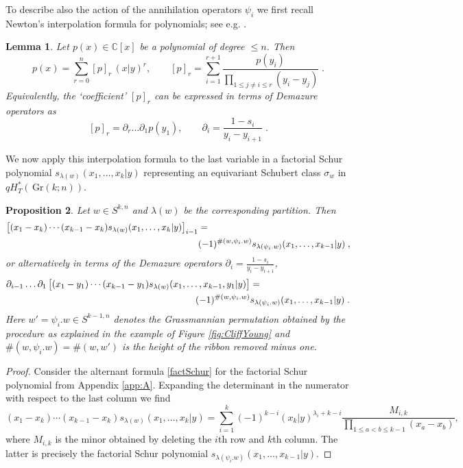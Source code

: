 \documentclass[12pt]{amsart}
\newcommand{\C}{\mathbb{C}}
\newcommand{\Gr}{\,\mathrm{Gr}}
\newtheorem{prop}{Proposition}[section]
\newtheorem{lemma}[prop]{Lemma}
\numberwithin{equation}{section}
\numberwithin{figure}{section}
\begin{document}
To describe also the action of the annihilation operators $\psi_i$ we first recall Newton's interpolation formula for polynomials; see e.g. \cite{macdonald1991notes}.
\begin{lemma}
    Let $p(x)\in\C[x]$ be a polynomial of degree $\le n$. Then
    \[
    p(x)=\sum_{r=0}^n[p]_r\,(x|y)^r,\qquad [p]_{r}=\sum_{i=1}^{r+1}\frac{p(y_i)}{\prod_{1\le j\ne i\le r}(y_i-y_j)}\;.
    \]
    Equivalently, the `coefficient' $[p]_r$ can be expressed in terms of Demazure operators as
    \[
    [p]_r=\partial_r\ldots\partial_1p(y_1),\qquad \partial_i=\frac{1-s_i}{y_i-y_{i+1}}\;.
    \]
\end{lemma}
We now apply this interpolation formula to the last variable in a factorial Schur polynomial $s_{\lambda(w)}(x_1,\ldots,x_k|y)$ representing an equivariant Schubert class $\sigma_w$ in $qH^*_T(\Gr(k;n))$.
\begin{prop}
    Let $w\in S^{k,n}$ and $\lambda(w)$ be the corresponding partition. Then
    \begin{align}
        \left[(x_1 - x_k) \cdots (x_{k-1} - x_k)s_{\lambda(w)}(x_1, \ldots, x_k | y)\right]_{i-1} &=\notag\\
        &(-1)^{\#(w,\psi_i.w)} s_{\lambda(\psi_i.w)}(x_1, \ldots, x_{k - 1}|y)\;,\label{annihshuffle}
    \end{align}
    or alternatively in terms of the Demazure operators $\partial_i=\frac{1-s_i}{y_i-y_{i+1}}$,
    \begin{align}
        \partial_{i-1}\ldots\partial_1\left[(x_1 - y_1) \cdots (x_{k-1} - y_1)s_{\lambda(w)}(x_1, \ldots, x_{k-1},y_1 | y)\right] &=\notag\\
        (-1)^{\#(w,\psi_i.w)}& s_{\lambda(\psi_i.w)}(x_1, \ldots, x_{k - 1}|y)\;.\label{annihshuffle2}
    \end{align}
    Here $w'=\psi_i.w\in S^{k-1,n}$ denotes the Grassmannian permutation obtained by the procedure as explained in the example of Figure \ref{fig:CliffYoung} and $\#(w,\psi_i.w)=\#(w,w')$ is the height of the ribbon removed minus one.
\end{prop}

\begin{proof}
    Consider the alternant formula \eqref{factSchur} for the factorial Schur polynomial from Appendix \ref{app:A}. Expanding the determinant in the numerator with respect to the last column we find
    \begin{equation*}
        (x_1 - x_k) \cdots (x_{k-1} - x_k)s_{\lambda(w)}(x_1, \ldots, x_k | y)=\sum_{i=1}^k(-1)^{k-i}(x_k|y)^{\lambda_i+k-i}\frac{M_{i,k}}{\prod_{1\le a<b\le k-1}(x_a-x_b)},
    \end{equation*}
    where $M_{i,k}$ is the minor obtained by deleting the $i$th row and $k$th column. The latter is precisely the factorial Schur polynomial $s_{\lambda(\psi_i.w)}(x_1,\ldots,x_{k-1}|y)$.
\end{proof}
\end{document}
